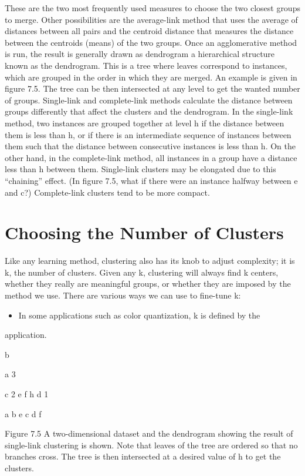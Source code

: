 These are the two most frequently used measures to choose the two closest groups to merge. Other possibilities are the average-link method that uses the average of distances between all pairs and the centroid distance that measures the distance between the centroids (means) of the two groups. Once an agglomerative method is run, the result is generally drawn as dendrogram a hierarchical structure known as the dendrogram. This is a tree where leaves correspond to instances, which are grouped in the order in which they are merged. An example is given in figure 7.5. The tree can be then intersected at any level to get the wanted number of groups. Single-link and complete-link methods calculate the distance between groups differently that affect the clusters and the dendrogram. In the single-link method, two instances are grouped together at level h if the distance between them is less than h, or if there is an intermediate sequence of instances between them such that the distance between consecutive instances is less than h. On the other hand, in the complete-link method, all instances in a group have a distance less than h between them. Single-link clusters may be elongated due to this “chaining” effect. (In figure 7.5, what if there were an instance halfway between e and c?) Complete-link clusters tend to be more compact.

\section{Choosing the Number of Clusters}

Like any learning method, clustering also has its knob to adjust complexity; it is k, the number of clusters. Given any k, clustering will always find k centers, whether they really are meaningful groups, or whether they are imposed by the method we use. There are various ways we can use to fine-tune k:

\begin{itemize}
\item In some applications such as color quantization, k is defined by the
\end{itemize}

application.

b

a 3

c 2 e f h d 1

a b e c d f

Figure 7.5 A two-dimensional dataset and the dendrogram showing the result of single-link clustering is shown. Note that leaves of the tree are ordered so that no branches cross. The tree is then intersected at a desired value of h to get the clusters.

